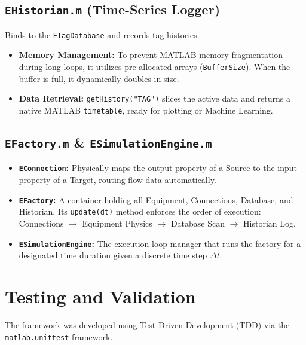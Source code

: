 \documentclass[11pt,a4paper]{report}
\begin{document}
\section{\texttt{EHistorian.m} (Time-Series Logger)}
Binds to the \texttt{ETagDatabase} and records tag histories.
\begin{itemize}
    \item \textbf{Memory Management:} To prevent MATLAB memory fragmentation during long loops, it utilizes pre-allocated arrays (\texttt{BufferSize}). When the buffer is full, it dynamically doubles in size.
    \item \textbf{Data Retrieval:} \texttt{getHistory("TAG")} slices the active data and returns a native MATLAB \texttt{timetable}, ready for plotting or Machine Learning.
\end{itemize}

\section{\texttt{EFactory.m} \& \texttt{ESimulationEngine.m}}
\begin{itemize}
    \item \textbf{\texttt{EConnection}:} Physically maps the output property of a Source to the input property of a Target, routing flow data automatically.
    \item \textbf{\texttt{EFactory}:} A container holding all Equipment, Connections, Database, and Historian. Its \texttt{update(dt)} method enforces the order of execution: Connections $\rightarrow$ Equipment Physics $\rightarrow$ Database Scan $\rightarrow$ Historian Log.
    \item \textbf{\texttt{ESimulationEngine}:} The execution loop manager that runs the factory for a designated time duration given a discrete time step $\Delta t$.
\end{itemize}

\chapter{Testing and Validation}
The framework was developed using Test-Driven Development (TDD) via the \texttt{matlab.unittest} framework.
\end{document}
